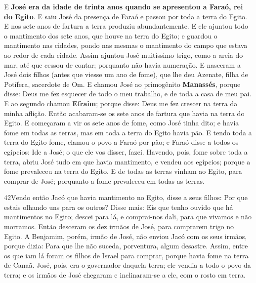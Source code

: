E \textbf{José era da idade de trinta anos quando se apresentou a
Faraó, rei do Egito}. E saiu José da presença de Faraó e passou por
toda a terra do Egito. E nos sete anos de fartura a terra
produziu abundantemente. E ele ajuntou todo o mantimento dos
sete anos, que houve na terra do Egito; e guardou o mantimento nas
cidades, pondo nas mesmas o mantimento do campo que estava ao redor
de cada cidade. Assim ajuntou José muitíssimo trigo, como a
areia do mar, até que cessou de contar; porquanto não havia
numeração. E nasceram a José dois filhos (antes que viesse um
ano de fome), que lhe deu Azenate, filha de Potífera, sacerdote de
Om. E chamou José ao primogênito \textbf{Manassés}, porque
disse: Deus me fez esquecer de todo o meu trabalho, e de toda a casa
de meu pai. E ao segundo chamou \textbf{Efraim}; porque
disse: Deus me fez crescer na terra da minha aflição. Então
acabaram-se os sete anos de fartura que havia na terra do Egito.
E começaram a vir os sete anos de fome, como José tinha dito;
e havia fome em todas as terras, mas em toda a terra do Egito havia
pão. E tendo toda a terra do Egito fome, clamou o povo a
Faraó por pão; e Faraó disse a todos os egípcios: Ide a José; o que
ele vos disser, fazei. Havendo, pois, fome sobre toda a
terra, abriu José tudo em que havia mantimento, e vendeu aos
egípcios; porque a fome prevaleceu na terra do Egito. E de
todas as terras vinham ao Egito, para comprar de José; porquanto a
fome prevaleceu em todas as terras.

\smallskip

\lettrine{42} Vendo então Jacó que havia mantimento no Egito,
disse a seus filhos: Por que estais olhando uns para os outros?
Disse mais: Eis que tenho ouvido que há mantimentos no Egito;
descei para lá, e comprai-nos dali, para que vivamos e não morramos.
Então desceram os dez irmãos de José, para comprarem trigo no
Egito. A Benjamim, porém, irmão de José, não enviou Jacó com os
seus irmãos, porque dizia: Para que lhe não suceda, porventura,
algum desastre. Assim, entre os que iam lá foram os filhos de
Israel para comprar, porque havia fome na terra de Canaã. José,
pois, era o governador daquela terra; ele vendia a todo o povo da
terra; e os irmãos de José chegaram e inclinaram-se a ele, com o
rosto em terra.

